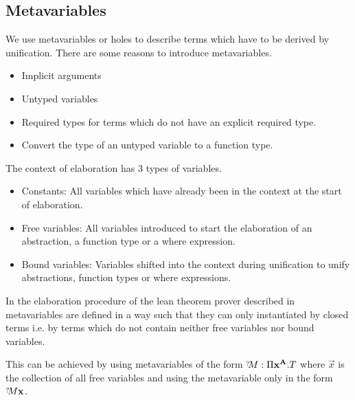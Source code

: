 \subsection{Metavariables}

We use metavariables or holes to describe terms which have to be derived by
unification. There are some reasons to introduce metavariables.

\begin{itemize}

\item Implicit arguments

\item Untyped variables

\item Required types for terms which do not have an explicit required type.

\item Convert the type of an untyped variable to a function type.

\end{itemize}


The context of elaboration has 3 types of variables.

\begin{itemize}

\item Constants: All variables which have already been in the context at the
start of elaboration.

\item Free variables: All variables introduced to start the elaboration of an
abstraction, a function type or a where expression.

\item Bound variables: Variables shifted into the context during unification to
unify abstractions, function types or where expressions.

\end{itemize}

In the elaboration procedure of the lean theorem prover described in
\cite{demoura2015} metavariables are defined in a way such that they can only
instantiated by closed terms i.e. by terms which do not contain neither free
variables nor bound variables.

This can be achieved by using metavariables of the form $\meta{M}: \Pi
\vec{x}^{\vec{A}}.T$ where $\vec{x}$ is the collection of all free variables and
using the metavariable only in the form $\meta{M} \vec{x}$.


